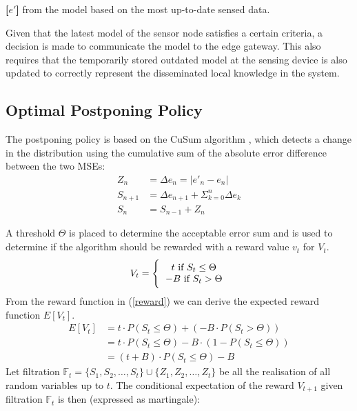 \documentclass{mpaper}
\begin{document}
\textbf{[$e'$]} from the model based on the most up-to-date sensed data.

Given that the latest model of the sensor node satisfies a certain criteria, a decision is made to communicate the model to the edge gateway. This also requires that the temporarily stored outdated model at the sensing device is also updated to correctly represent the disseminated local knowledge in the system.

\subsection*{Optimal Postponing Policy}
The postponing policy is based on the CuSum algorithm \cite{page1954}, which detects a change in the distribution using the cumulative sum of the absolute error difference between the two MSEs:
\begin{align}
    Z_n &= \Delta e_n = | e'_n - e_n |\\
    S_{n+1} &= \Delta e_{n+1} + \Sigma_{k=0}^n \Delta e_k\\
    S_n &= S_{n-1} + Z_n\label{eq:1}
\end{align}

A threshold $\Theta$ is placed to determine the acceptable error sum and is used to determine if the algorithm should be rewarded with a reward value $v_t$ for $V_t$.
\begin{equation}\label{reward}
    V_t = \Bigg\{ \begin{tabular}{c}
                  $t\ \text{if}\ S_t \leq \Theta$ \\
                  $-B\ \text{if}\ S_t > \Theta$
                  \end{tabular}
\end{equation}
From the reward function in (\ref{reward}) we can derive the expected reward function $E[V_t]$. 
\begin{equation}
\begin{split}
    E[V_t] & = t \cdot P(S_t \leq \Theta) + (-B \cdot P(S_t > \Theta))\\
    & = t \cdot P(S_t \leq \Theta) - B \cdot (1 - P(S_t \leq \Theta))\\
    & = (t + B) \cdot P(S_t \leq \Theta) - B
\end{split}
\end{equation}
Let filtration $\mathbb{F}_{t} = \{S_{1}, S_{2}, \ldots, S_{t}\} \cup \{Z_{1}, Z_{2}, \ldots, Z_{t}\}$ be all the realisation of all random variables up to $t$.
The conditional expectation of the reward $V_{t+1}$ given filtration $\mathbb{F}_{t}$ is then (expressed as martingale):
\end{document}
